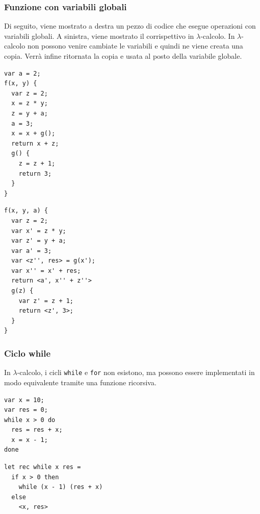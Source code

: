 \documentclass{article}
\begin{document}
\subsubsection{Funzione con variabili globali}
Di seguito, viene mostrato a destra un pezzo di codice che esegue operazioni con variabili globali. A sinistra, viene mostrato il corrispettivo in $\lambda$-calcolo. In $\lambda$-calcolo non possono venire cambiate le variabili e quindi ne viene creata una copia. Verrà infine ritornata la copia e usata al posto della variabile globale.

\begin{minipage}{0.49\textwidth}
\begin{lstlisting}[mathescape=true]
var a = 2;
f(x, y) {
  var z = 2;
  x = z * y;
  z = y + a;
  a = 3;
  x = x + g();
  return x + z;
  g() {
    z = z + 1;
    return 3;
  }
}
\end{lstlisting}
\end{minipage}
\begin{minipage}{0.49\textwidth}
\begin{lstlisting}[mathescape=true]
f(x, y, a) {
  var z = 2;
  var x' = z * y;
  var z' = y + a;
  var a' = 3;
  var <z'', res> = g(x');
  var x'' = x' + res;
  return <a', x'' + z''>
  g(z) {
    var z' = z + 1;
    return <z', 3>;
  }
}
\end{lstlisting}
\end{minipage}

\subsubsection{Ciclo while}
In $\lambda$-calcolo, i cicli \verb|while| e \verb|for| non esistono, ma possono essere implementati in modo equivalente tramite una funzione ricorsiva.

\begin{minipage}{0.49\textwidth}
\begin{lstlisting}[mathescape=true]
var x = 10;
var res = 0;
while x > 0 do
  res = res + x;
  x = x - 1;
done
\end{lstlisting}
\end{minipage}
\begin{minipage}{0.49\textwidth}
\begin{lstlisting}[mathescape=true]
let rec while x res =
  if x > 0 then
    while (x - 1) (res + x)
  else 
    <x, res>
\end{lstlisting}
\end{minipage}
\end{document}
